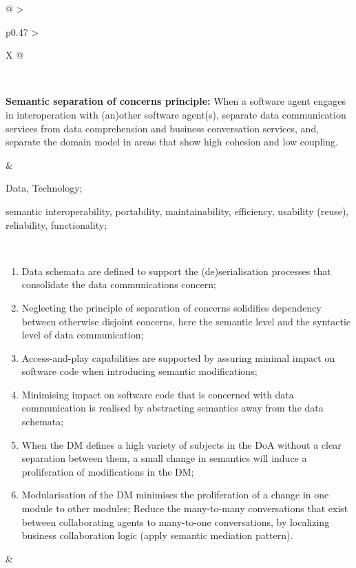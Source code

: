 \begin{xltabular}[l]{\linewidth}{@{} >{\small\raggedright\arraybackslash}p{0.47\linewidth} >{\small\raggedright\arraybackslash}X @{}}
\begin{enumerate}[left=10pt, nosep]
\end{enumerate} \\
%
%
%
\begin{mmdp}\label{dp:ssoc}{\bfseries Semantic separation of concerns principle:}
\quad When a software agent engages in interoperation with (an)other software agent(s), separate data communication services from data comprehension and business conversation services, and, separate the domain model in areas that show high cohesion and low coupling. \end{mmdp}
&
\begin{description}[labelwidth=3.7cm,leftmargin=3.7cm+1ex,nosep,topsep=2ex,labelsep=1ex,font=\bfseries]
\item[Type of information:] Data, Technology;
\item[Quality attributes:] semantic interoperability, portability, maintainability, efficiency, usability (reuse), reliability, functionality;
\end{description}
\\
\begin{enumerate}[left=6pt, nosep]
  \item Data schemata are defined to support the (de)serialisation processes that consolidate the data communications concern;
  \item Neglecting the principle of separation of concerns solidifies dependency between otherwise disjoint concerns, here the semantic level and the syntactic level of data communication;
  \item Access-and-play capabilities are supported by assuring minimal impact on software code when introducing semantic modifications;
  \item Minimising impact on software code that is concerned with data communication is realised by abstracting semantics away from the data schemata;
  \item When the DM defines a high variety of subjects in the DoA without a clear separation between them, a small change in semantics will induce a proliferation of modifications in the DM;
  \item Modularisation of the DM minimises the proliferation of a change in one module to other modules;
  \tem Reduce the many-to-many conversations that exist between collaborating agents to many-to-one conversations, by localizing business collaboration logic (apply semantic mediation pattern).
\end{enumerate}
&
\begin{enumerate}[left=10pt, nosep]

\end{enumerate}
\end{xltabular}
